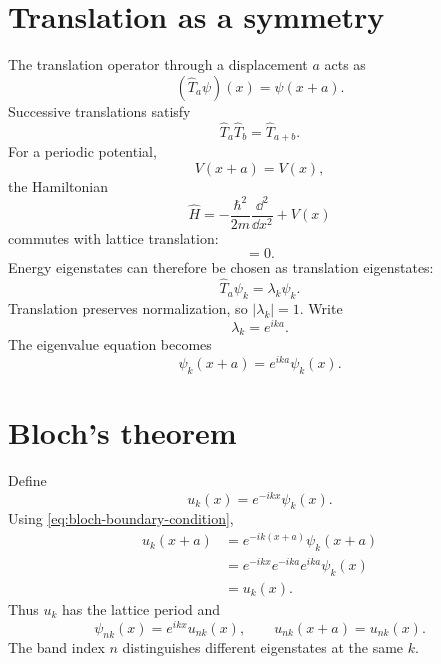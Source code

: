 \section{Translation as a symmetry}

The translation operator through a displacement $a$ acts as
\begin{equation}
  (\hat T_a\psi)(x)=\psi(x+a).
  \label{eq:translation-operator-action}
\end{equation}
Successive translations satisfy
\begin{equation}
  \hat T_a\hat T_b=\hat T_{a+b}.
  \label{eq:translation-group-composition}
\end{equation}
For a periodic potential,
\begin{equation}
  V(x+a)=V(x),
  \label{eq:periodic-potential}
\end{equation}
the Hamiltonian
\begin{equation}
  \hat H
  =-\frac{\hbar^2}{2m}\frac{\dd^2}{\dd x^2}+V(x)
  \label{eq:periodic-one-electron-hamiltonian}
\end{equation}
commutes with lattice translation:
\begin{equation}
  [\hat H,\hat T_a]=0.
  \label{eq:hamiltonian-translation-commutator}
\end{equation}
Energy eigenstates can therefore be chosen as translation eigenstates:
\begin{equation}
  \hat T_a\psi_k=\lambda_k\psi_k.
  \label{eq:translation-eigenvalue-equation}
\end{equation}
Translation preserves normalization, so $|\lambda_k|=1$.  Write
\begin{equation}
  \lambda_k=e^{ika}.
  \label{eq:translation-eigenvalue-phase}
\end{equation}
The eigenvalue equation becomes
\begin{equation}
  \boxed{
  \psi_k(x+a)=e^{ika}\psi_k(x).
  }
  \label{eq:bloch-boundary-condition}
\end{equation}

\section{Bloch's theorem}

Define
\begin{equation}
  u_k(x)=e^{-ikx}\psi_k(x).
  \label{eq:bloch-periodic-part-definition}
\end{equation}
Using \cref{eq:bloch-boundary-condition},
\begin{equation}
\begin{aligned}
  u_k(x+a)
  &=e^{-ik(x+a)}\psi_k(x+a)\\
  &=e^{-ikx}e^{-ika}e^{ika}\psi_k(x)\\
  &=u_k(x).
\end{aligned}
  \label{eq:bloch-periodic-part-proof}
\end{equation}
Thus $u_k$ has the lattice period and
\begin{equation}
  \boxed{
  \psi_{nk}(x)=e^{ikx}u_{nk}(x),
  \qquad u_{nk}(x+a)=u_{nk}(x).
  }
  \label{eq:bloch-theorem-one-dimensional}
\end{equation}
The band index $n$ distinguishes different eigenstates at the same $k$.

